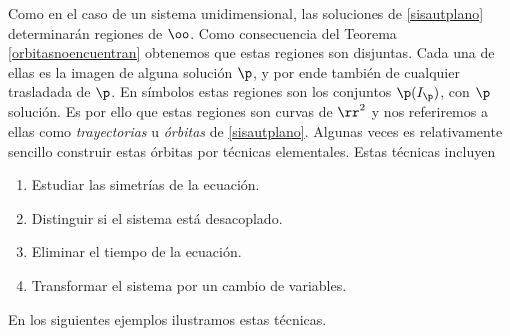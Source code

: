 Como en el caso de un sistema unidimensional, las soluciones de
\ref{sisautplano} determinarán regiones de $\oo$. Como
consecuencia del Teorema \ref{orbitasnoencuentran} obtenemos que
estas regiones son disjuntas. Cada una de ellas es la imagen de
alguna solución $\p$, y por ende también de cualquier trasladada
de $\p$. En símbolos estas regiones son los conjuntos
$\p(I_{\p})$, con $\p$ solución. Es por ello que estas regiones
son curvas de $\rr^2$ y nos referiremos a ellas como
\emph{trayectorias} u \emph{órbitas} de
\eqref{sisautplano}. Algunas veces es relativamente  sencillo
construir estas órbitas por técnicas elementales. Estas técnicas
incluyen
\begin{enumerate}
    \item Estudiar las simetrías de la ecuación.
    \item Distinguir si el sistema está desacoplado.
    \item Eliminar el tiempo de la ecuación.
    \item Transformar el sistema por un cambio de variables.
\end{enumerate}
 En los siguientes ejemplos ilustramos estas técnicas.





